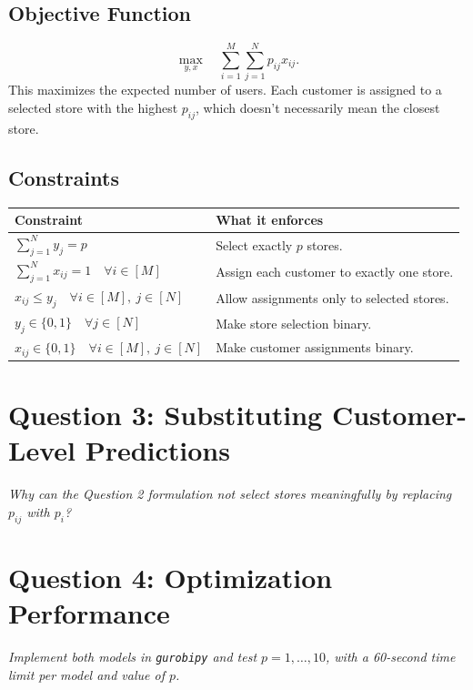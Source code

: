 \documentclass{article}
\newcommand{\question}[1]{\par\medskip\noindent\textit{#1}\par\smallskip}
\begin{document}
\subsection*{Objective Function}
\begin{equation}
\max_{y,x}\quad \sum_{i=1}^{M}\sum_{j=1}^{N}p_{ij}x_{ij}.
\label{eq:expected-usage}
\end{equation}
This maximizes the expected number of users. Each customer is assigned to a selected store
with the highest $p_{ij}$, which doesn't necessarily mean the closest store.

\subsection*{Constraints}
\begin{center}
\begin{tabular}{@{}p{}p{}@{}}
\toprule
\textbf{Constraint} & \textbf{What it enforces} \\
\midrule
$\sum_{j=1}^{N}y_j=p$ & Select exactly $p$ stores. \\[6pt]
$\sum_{j=1}^{N}x_{ij}=1\quad \forall i\in[M]$ & Assign each customer to exactly one store. \\[6pt]
$x_{ij}\le y_j\quad \forall i\in[M],\ j\in[N]$ & Allow assignments only to selected stores. \\[6pt]
$y_j\in\{0,1\}\quad \forall j\in[N]$ & Make store selection binary. \\[6pt]
$x_{ij}\in\{0,1\}\quad \forall i\in[M],\ j\in[N]$ & Make customer assignments binary. \\
\bottomrule
\end{tabular}
\end{center}

\clearpage
\section*{Question 3: Substituting Customer-Level Predictions}
\question{Why can the Question 2 formulation not select stores meaningfully by replacing $p_{ij}$ with $p_i$?}

\section*{Question 4: Optimization Performance}
\question{Implement both models in \texttt{gurobipy} and test $p=1,\ldots,10$, with a 60-second time limit per model and value of $p$.}
\end{document}
